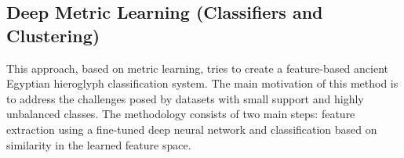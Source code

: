\documentclass[10pt,onecolumn,letterpaper]{article}
\begin{document}






\subsection{Deep Metric Learning (Classifiers and Clustering)}
\label{sec4_1}
This approach, based on metric learning, tries to create a feature-based ancient Egyptian hieroglyph classification system. The main motivation of this method is to address the challenges posed by datasets with small support and highly unbalanced classes. The methodology consists of two main steps: feature extraction using a fine-tuned deep neural network and classification based on similarity in the learned feature space.
\end{document}
